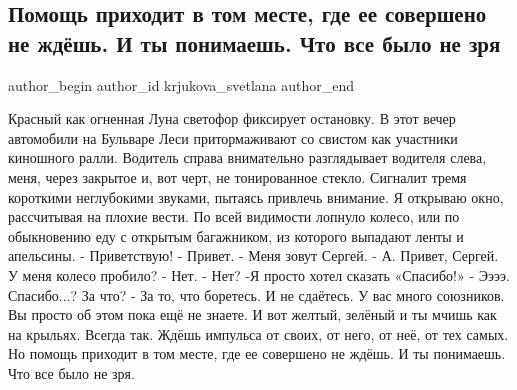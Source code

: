  
 
 
 
 
 
\subsection{Помощь приходит в том месте, где ее совершено не ждёшь. И ты понимаешь. Что все было не зря}
\label{sec:08_09_2021.fb.krjukova_svetlana.1.svetofor_podderzhka_voditel}
 
\ifcmt
 author_begin
   author_id krjukova_svetlana
 author_end
\fi

\obeycr
Красный как огненная Луна светофор фиксирует остановку. В этот вечер автомобили на Бульваре Леси притормаживают со свистом как участники киношного ралли. 
Водитель справа внимательно разглядывает водителя слева, меня, через закрытое и, вот черт, не тонированное стекло. Сигналит тремя короткими неглубокими звуками, пытаясь привлечь внимание. Я открываю окно, рассчитывая на плохие вести. По всей видимости лопнуло колесо, или  по обыкновению еду с открытым багажником, из которого выпадают ленты и апельсины. 
- Приветствую! 
- Привет. 
- Меня зовут Сергей. 
- А. Привет, Сергей. У меня колесо пробило?
- Нет. 
- Нет?
-Я просто хотел сказать «Спасибо!»
- Ээээ. Спасибо...? За что? 
- За то, что боретесь. И не сдаётесь. У вас много союзников. Вы просто об этом пока ещё не знаете. 
И вот желтый, зелёный и ты мчишь как на крыльях. 
Всегда так. Ждёшь импульса от своих, от него, от неё, от тех самых. Но помощь приходит в том месте, где ее совершено не ждёшь. 
И ты понимаешь. 
Что все было не зря.
\restorecr

